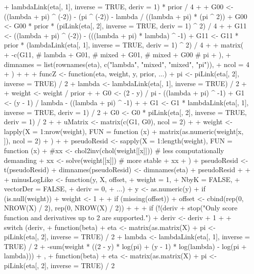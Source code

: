 \documentclass[nojss]{jss}
\newcommand{\1}{\mathcal{I}} \newcommand{\bZero}{\boldsymbol{0}}
\begin{document}
\begin{CodeChunk}
\begin{CodeInput}
{{+       lambdaLink(eta[, 1], inverse = TRUE, deriv = 1) * prior / 4
+
+     G00 <- ((lambda + pi) ^ (-2)) - (pi ^ (-2)) - lambda / ((lambda + pi) * (pi ^ 2))
+     G00 <- G00 * prior * (piLink(eta[, 2], inverse = TRUE, deriv = 1) ^ 2) / 4
+
+     G11 <- ((lambda + pi) ^ (-2)) - (((lambda + pi) * lambda) ^ -1)
+     G11 <- G11 * prior * (lambdaLink(eta[, 1], inverse = TRUE, deriv = 1) ^ 2) / 4
+
+     matrix(
+       -c(G11, # lambda
+          G01, # mixed
+          G01, # mixed
+          G00  # pi
+       ),
+       dimnames = list(rownames(eta), c("lambda", "mixed", "mixed", "pi")),
+       ncol = 4
+     )
+   }
+
+   funcZ <- function(eta, weight, y, prior, ...) {
+     pi     <-     piLink(eta[, 2], inverse = TRUE) / 2
+     lambda <- lambdaLink(eta[, 1], inverse = TRUE) / 2
+
+     weight <- weight / prior
+
+     G0 <- (2 - y) / pi     - ((lambda + pi) ^ -1)
+     G1 <- (y - 1) / lambda - ((lambda + pi) ^ -1)
+
+     G1 <- G1 * lambdaLink(eta[, 1], inverse = TRUE, deriv = 1) / 2
+     G0 <- G0 *     piLink(eta[, 2], inverse = TRUE, deriv = 1) / 2
+
+     uMatrix <- matrix(c(G1, G0), ncol = 2)
+
+     weight <- lapply(X = 1:nrow(weight), FUN = function (x) {
+       matrix(as.numeric(weight[x, ]), ncol = 2)
+     })
+
+     pseudoResid <- sapply(X = 1:length(weight), FUN = function (x) {
+       #xx <- chol2inv(chol(weight[[x]])) # less computationally demanding
+       xx <- solve(weight[[x]]) # more stable
+       xx %
+     })
+     pseudoResid <- t(pseudoResid)
+     dimnames(pseudoResid) <- dimnames(eta)
+     pseudoResid
+   }
+
+   minusLogLike <- function(y, X, offset,
+                            weight    = 1,
+                            NbyK      = FALSE,
+                            vectorDer = FALSE,
+                            deriv     = 0,
+                            ...) {
+     y <- as.numeric(y)
+     if (is.null(weight)) {
+       weight <- 1
+     }
+     if (missing(offset)) {
+       offset <- cbind(rep(0, NROW(X) / 2), rep(0, NROW(X) / 2))
+     }
+
+     if (!(deriv %
+       stop("Only score function and derivatives up to 2 are supported.")
+     deriv <- deriv + 1
+
+     switch (deriv,
+       function(beta) {
+         eta <- matrix(as.matrix(X) %
+         pi     <-     piLink(eta[, 2], inverse = TRUE) / 2
+         lambda <- lambdaLink(eta[, 1], inverse = TRUE) / 2
+         -sum(weight * ((2 - y) * log(pi) + (y - 1) * log(lambda) - log(pi + lambda)))
+       },
+       function(beta) {
+         eta <- matrix(as.matrix(X) %
+         pi     <-     piLink(eta[, 2], inverse = TRUE) / 2
}}}
\end{CodeInput}
\end{CodeChunk}
\end{document}
